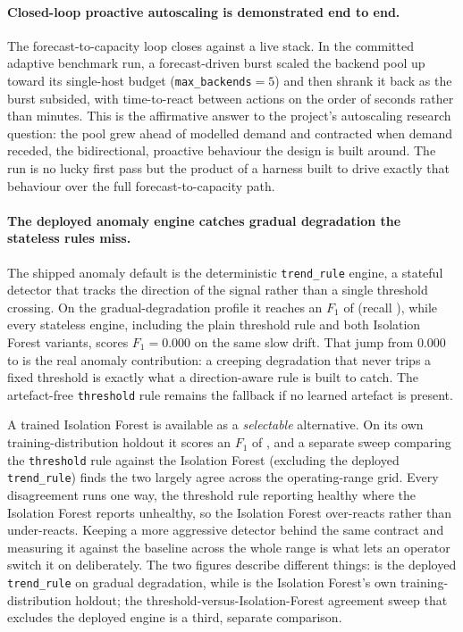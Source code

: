 \paragraph{Closed-loop proactive autoscaling is demonstrated end to end.} The
forecast-to-capacity loop closes against a live stack. In the committed adaptive
benchmark run, a forecast-driven burst scaled the
backend pool up toward its single-host budget (\texttt{max\_backends}$=5$) and then
shrank it back as the burst subsided, with time-to-react between actions on the order
of seconds rather than minutes.
This is the affirmative answer to the project's autoscaling research question: the
pool grew ahead of modelled demand and contracted when demand receded, the
bidirectional, proactive behaviour the design is built around. The run is no lucky
first pass but the product of a harness built to drive exactly that behaviour over
the full forecast-to-capacity path.

\paragraph{The deployed anomaly engine catches gradual degradation the stateless rules miss.}
The shipped anomaly default is the deterministic \texttt{trend\_rule} engine, a
stateful detector that tracks the direction of the signal rather than a single
threshold crossing. On the gradual-degradation profile it reaches an $F_1$ of
\BManFone{} (recall \BManRecall{}), while every stateless
engine, including the plain threshold rule and both Isolation Forest variants, scores
$F_1=0.000$ on the same slow drift. That jump from $0.000$ to \BManFone{} is the real
anomaly contribution: a creeping degradation that never trips a fixed threshold is
exactly what a direction-aware rule is built to catch. The artefact-free
\texttt{threshold} rule remains the fallback if no learned artefact is present.

A trained Isolation Forest is available as a \emph{selectable} alternative. On its own
training-distribution holdout it scores an $F_1$ of \BMifFone{}, and a separate sweep
comparing the \texttt{threshold} rule against the Isolation Forest (excluding the
deployed \texttt{trend\_rule}) finds the two largely agree across the
operating-range grid. Every disagreement runs one way, the threshold rule reporting
healthy where the Isolation Forest reports unhealthy, so the Isolation Forest
over-reacts rather than under-reacts. Keeping a more aggressive detector behind the
same contract and measuring it against the baseline across the whole range is what
lets an operator switch it on deliberately. The two figures describe
different things: \BManFone{} is the deployed \texttt{trend\_rule} on gradual
degradation, while \BMifFone{} is the Isolation Forest's own training-distribution
holdout; the threshold-versus-Isolation-Forest agreement sweep that excludes the
deployed engine is a third, separate comparison.

